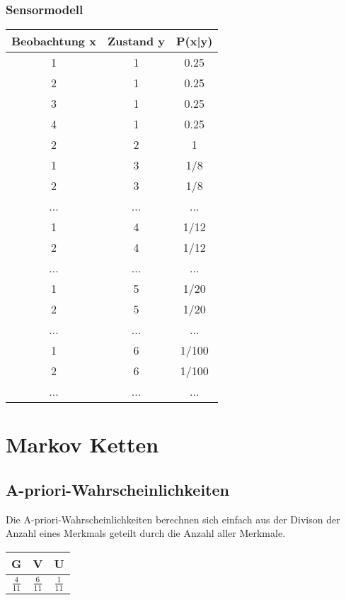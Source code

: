 \documentclass[a4paper]{article}
\begin{document}
\subsubsection{Sensormodell}
\begin{tabular}{|c|c|c|}
\hline
Beobachtung x & Zustand y & P(x|y) \\\hline
1 & 1 & 0.25\\
2 & 1 & 0.25 \\
3 & 1 & 0.25 \\
4 & 1 & 0.25 \\\hline
2 & 2 & 1 \\\hline
1 & 3 & 1/8 \\
2 & 3 & 1/8 \\
... & ... & ... \\\hline
1 & 4 & 1/12 \\
2 & 4 & 1/12 \\
... & ... & ... \\\hline
1 & 5 & 1/20 \\
2 & 5 & 1/20 \\
... & ... & ... \\\hline
1 & 6 & 1/100 \\
2 & 6 & 1/100 \\
... & ... & ... \\\hline
\end{tabular}


\section{Markov Ketten}
\subsection{A-priori-Wahrscheinlichkeiten}
Die A-priori-Wahrscheinlichkeiten  berechnen sich einfach aus der Divison der Anzahl eines Merkmals geteilt durch die Anzahl aller Merkmale.\\
\begin{tabular}{|c|c|c|}
\hline
G & V & U \\\hline
$\frac{4}{11} $&$ \frac{6}{11} $&$ \frac{1}{11} $\\\hline
\end{tabular}
\end{document}
